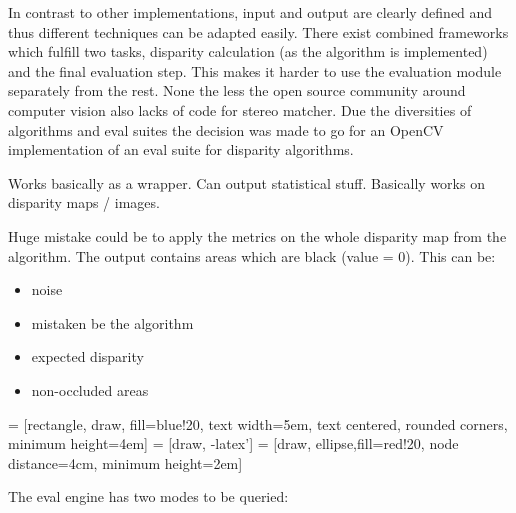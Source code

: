 In contrast to other implementations, input and output are clearly defined and thus different techniques can be adapted easily.
There exist combined frameworks which fulfill two tasks, disparity calculation (as the algorithm is implemented) and the final evaluation step.
This makes it harder to use the evaluation module separately from the rest.
None the less the open source community around computer vision also lacks of code for stereo matcher.
Due the diversities of algorithms and eval suites the decision was made to go for an OpenCV implementation of an eval suite for disparity algorithms.

Works basically as a wrapper. Can output statistical stuff. Basically works on disparity maps / images.

Huge mistake could be to apply the metrics on the whole disparity map from the algorithm. The output contains areas which are black (value = 0). This can be:

\begin{itemize}
  \item noise
  \item mistaken be the algorithm
  \item expected disparity
  \item non-occluded areas
\end{itemize}

 = [rectangle, draw, fill=blue!20,
    text width=5em, text centered, rounded corners, minimum height=4em]
 = [draw, -latex']
 = [draw, ellipse,fill=red!20, node distance=4cm,
    minimum height=2em]

\begin{center}
\end{center}

The eval engine has two modes to be queried:

